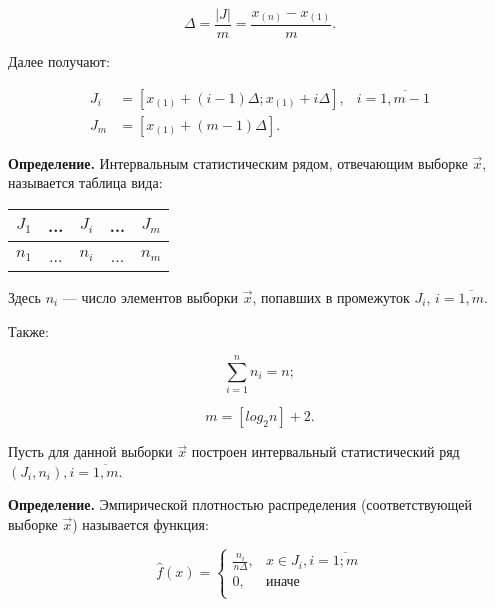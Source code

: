 \begin{equation}\label{eq:06}
    \Delta = \frac{|J|}{m} = \frac{x_{(n)} - x_{(1)}}{m}.
\end{equation}

Далее получают:

\begin{equation}\label{eq:07}
    \begin{aligned}
        J_i &= [x_{(1)} + (i - 1) \Delta; x_{(1)} + i \Delta],
        & i = \overline{1, m-1}\\
        J_m &= [x_{(1)} + (m - 1) \Delta].
    \end{aligned}
\end{equation}

\textbf{Определение.} Интервальным статистическим рядом, отвечающим
выборке $\vec{x}$, называется таблица вида:

\begin{table}[htb]
    \centering
    \begin{tabular}{|c|c|c|c|c|}
        \hline
        $J_1$ & ... & $J_i$ & ... & $J_m$ \\
        \hline
        $n_1$ & ... & $n_i$ & ... & $n_m$ \\
        \hline
    \end{tabular}
\end{table}

Здесь $n_i$ --- число элементов выборки $\vec{x}$, попавших в промежуток $J_i$,
$i= \overline{1,m}$.

Также:

\begin{equation}\label{eq:08}
    \sum_{i=1}^{n} n_i = n;
\end{equation}

\begin{equation}\label{eq:09}
    m = [log_2 n] + 2.
\end{equation}

Пусть для данной выборки $\vec{x}$ построен интервальный статистический
ряд~$(J_i, n_i), i=\overline{1,m}$.

\textbf{Определение.} Эмпирической плотностью распределения (соответствующей
выборке $\vec{x}$) называется функция:

\begin{equation}
    \hat f(x) =
    \begin{cases}
        \frac{n_i}{n \Delta}, &x \in J_i, i = \overline{1; m} \\
        0, &\text{иначе} \\
    \end{cases}
\end{equation}

